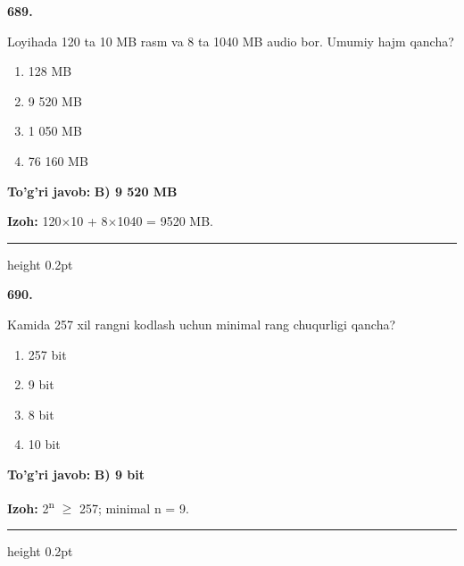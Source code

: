 \documentclass[10pt,a4paper,oneside]{article}
\begin{document}
\noindent\textbf{\color{ink}689.}
\par
Loyihada 120 ta 10 MB rasm va 8 ta 1040 MB audio bor. Umumiy hajm qancha?
\begin{enumerate}[label=\Alph*),leftmargin=9mm]
\item 128 MB
\item 9 520 MB
\item 1 050 MB
\item 76 160 MB
\end{enumerate}
\begin{tcolorbox}[enhanced,breakable,colback=teal!4,colframe=teal!50!black,boxrule=0.5pt,arc=1.1mm,left=3mm,right=3mm,top=1.7mm,bottom=1.7mm,before skip=2mm,after skip=2mm]
\textbf{\color{teal}To'g'ri javob:} \textbf{B) 9 520 MB}
\par\smallskip
\textbf{Izoh:} 120\ensuremath{\times}10 + 8\ensuremath{\times}1040 = 9520 MB.
\end{tcolorbox}
\vspace{2mm}\hrule height 0.2pt \vspace{3mm}

\noindent\textbf{\color{ink}690.}
\par
Kamida 257 xil rangni kodlash uchun minimal rang chuqurligi qancha?
\begin{enumerate}[label=\Alph*),leftmargin=9mm]
\item 257 bit
\item 9 bit
\item 8 bit
\item 10 bit
\end{enumerate}
\begin{tcolorbox}[enhanced,breakable,colback=teal!4,colframe=teal!50!black,boxrule=0.5pt,arc=1.1mm,left=3mm,right=3mm,top=1.7mm,bottom=1.7mm,before skip=2mm,after skip=2mm]
\textbf{\color{teal}To'g'ri javob:} \textbf{B) 9 bit}
\par\smallskip
\textbf{Izoh:} 2\textsuperscript{n} \ensuremath{\geq} 257; minimal n = 9.
\end{tcolorbox}
\vspace{2mm}\hrule height 0.2pt \vspace{3mm}
\end{document}
